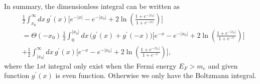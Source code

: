 \documentclass[onecolumn,preprintnumbers,amsmath,amssymb]{revtex4}
\begin{document}
In summary, the dimensionless integral can be written as
\begin{align}
&\frac{1}{2}\int^\infty_{x_0}dx\,g^\prime(x)\bigg[e^{-|x|}-e^{-|x_0|}+2\ln\left(\frac{1+e^{-|x_0|}}{1+e^{-|x|}}\right)\bigg]\\
&=\Theta(-x_0)\,\frac{1}{2}\int^{|x_0|}_0dx\,\bigg(g^\prime(x)+g^\prime(-x)\bigg)\bigg[e^{-x}-e^{-|x_0|}+2\ln\left(\frac{1+e^{-|x_0|}}{1+e^{-x}}\right)\bigg]\\&+\frac{1}{2}\int^\infty_{|x_0|}dx\,g^\prime(x)\bigg[e^{-x}-e^{-|x_0|}+2\ln\left(\frac{1+e^{-|x_0|}}{1+e^{-x}}\right)\bigg],
\end{align}
where the $1st$ integral only exist when the Fermi energy $E_F>m_e$ and given function $g^\prime(x)$ is even function. Otherwise we only have the Boltzmann integral.

\end{document}
